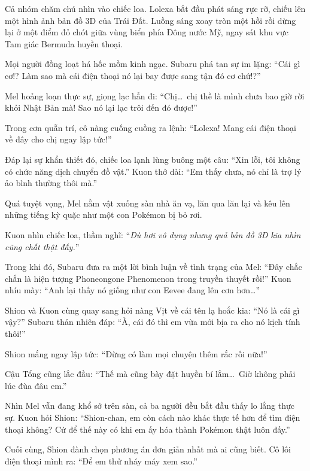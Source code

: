 \documentclass[../main.tex]{subfiles}
\begin{document}
Cả nhóm chăm chú nhìn vào chiếc loa. Lolexa bắt đầu phát sáng rực rỡ, chiếu lên một hình ảnh bản đồ 3D của Trái Đất. Luồng sáng xoay tròn một hồi rồi dừng lại ở một điểm đỏ chót giữa vùng biển phía Đông nước Mỹ, ngay sát khu vực Tam giác Bermuda huyền thoại.


Mọi người đồng loạt há hốc mồm kinh ngạc. Subaru phá tan sự im lặng: ``Cái gì cơ!? Làm sao mà cái điện thoại nó lại bay được sang tận đó cơ chứ!?''

Mel hoảng loạn thực sự, giọng lạc hẳn đi: ``Chị\dots\ chị thề là mình chưa bao giờ rời khỏi Nhật Bản mà! Sao nó lại lạc trôi đến đó được!''

Trong cơn quẫn trí, cô nàng cuống cuồng ra lệnh: ``Lolexa! Mang cái điện thoại về đây cho chị ngay lập tức!''

Đáp lại sự khẩn thiết đó, chiếc loa lạnh lùng buông một câu: ``Xin lỗi, tôi không có chức năng dịch chuyển đồ vật.''
Kuon thở dài: ``Em thấy chưa, nó chỉ là trợ lý ảo bình thường thôi mà.''

Quá tuyệt vọng, Mel nằm vật xuống sàn nhà ăn vạ, lăn qua lăn lại và kêu lên những tiếng kỳ quặc như một con Pokémon bị bỏ rơi.

Kuon nhìn chiếc loa, thầm nghĩ: ``\textit{Dù hơi vô dụng nhưng quả bản đồ 3D kia nhìn cũng chất thật đấy.}''

Trong khi đó, Subaru đưa ra một lời bình luận về tình trạng của Mel: ``Đây chắc chắn là hiện tượng Phoneongone Phenomenon trong truyền thuyết rồi!''
Kuon nhíu mày: ``Anh lại thấy nó giống như con Eevee đang lên cơn hơn\dots''

Shion và Kuon cùng quay sang hỏi nàng Vịt về cái tên lạ hoắc kia: ``Nó là cái gì vậy?'' Subaru thản nhiên đáp: ``À, cái đó thì em vừa mới bịa ra cho nó kịch tính thôi!''

Shion mắng ngay lập tức: ``Đừng có làm mọi chuyện thêm rắc rối nữa!''

Cậu Tổng cũng lắc đầu: ``Thế mà cũng bày đặt huyền bí lắm\dots\ Giờ không phải lúc đùa đâu em.''


Nhìn Mel vẫn đang khổ sở trên sàn, cả ba người đều bắt đầu thấy lo lắng thực sự. Kuon hỏi Shion: ``Shion-chan, em còn cách nào khác thực tế hơn để tìm điện thoại không? Cứ để thế này có khi em ấy hóa thành Pokémon thật luôn đấy.''

Cuối cùng, Shion đành chọn phương án đơn giản nhất mà ai cũng biết. Cô lôi điện thoại mình ra: ``Để em thử nháy máy xem sao.''
\end{document}
